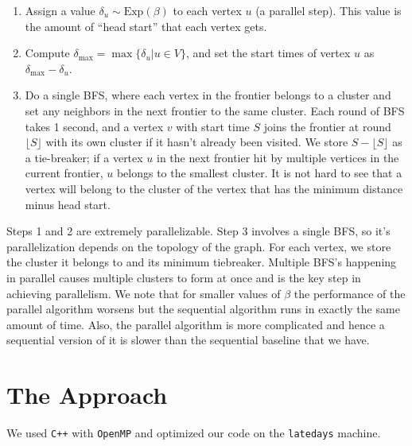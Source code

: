 \documentclass[11pt]{scrartcl}
\theoremstyle{plain}
\theoremstyle{definition}
\theoremstyle{remark}
\begin{document}
\begin{enumerate}

\item Assign a value $\delta_u\sim\text{Exp}(\beta)$ to each vertex $u$ (a parallel step). This value is the amount of ``head start'' that each vertex gets.

\item Compute $\delta_{\text{max}} = \max\{\delta_u|u\in V\}$, and set the start times of vertex $u$ as $\delta_{\text{max}}-\delta_u$.

\item Do a single BFS, where each vertex in the frontier belongs to a cluster and set any neighbors in the next frontier to the same cluster. Each round of BFS takes 1 second, and a vertex $v$ with start time $S$ joins the frontier at round $\lfloor S \rfloor$ with its own cluster if it hasn't already been visited. We store $S-\lfloor S \rfloor$ as a tie-breaker; if a vertex $u$ in the next frontier hit by multiple vertices in the current frontier, $u$ belongs to the smallest cluster. It is not hard to see that a vertex will belong to the cluster of the vertex that has the minimum distance minus head start.

\end{enumerate}
Steps 1 and 2 are extremely parallelizable. Step 3 involves a single BFS, so it's parallelization depends on the topology of the graph. For each vertex, we store the cluster it belongs to and its minimum tiebreaker.
Multiple BFS's happening in parallel causes multiple clusters to form at once and is the key step in
achieving parallelism. We note that for smaller values of
$\beta$ the performance of the parallel algorithm worsens
but the sequential algorithm runs in exactly the same
amount of time. Also, the parallel algorithm is more
complicated and hence a sequential version of it is
slower than the sequential baseline that we have.

\section{The Approach}
We used \texttt{C++} with \texttt{OpenMP} and optimized our code on the \texttt{latedays} machine.
\end{document}
